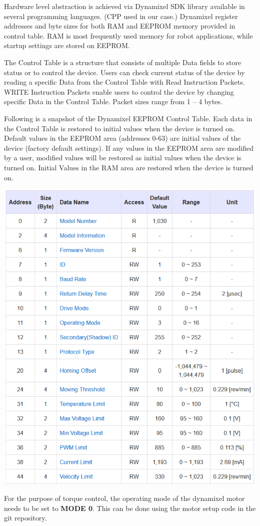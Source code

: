 \documentclass[12]{article}
\begin{document}
Hardware level abstraction is achieved via Dynamixel SDK library available in several programming languages. (CPP used in our case.)
Dynamixel register addresses and byte sizes for both RAM and EEPROM memory provided in control table. RAM is most frequently used memory for robot applications, while startup settings are stored on EEPROM.

The Control Table is a structure that consists of multiple Data fields to store status or to control the device. Users can check current status of the device by reading a specific Data from the Control Table with Read Instruction Packets. WRITE Instruction Packets enable users to control the device by changing specific Data in the Control Table. Packet sizes range from 1 – 4 bytes.

Following is a snapshot of the Dynamixel EEPROM Control Table. Each data in the Control Table is restored to initial values when the device is turned on. Default values in the EEPROM area (addresses 0-63) are initial values of the device (factory default settings). If any values in the EEPROM area are modified by a user, modified values will be restored as initial values when the device is turned on. Initial Values in the RAM area are restored when the device is turned on.

\begin{center}
	\includegraphics[width=0.7\linewidth]{images/dxl_eeprom.png}\\
\end{center}

For the purpose of torque control, the operating mode of the dynamixel motor needs to be set to \textbf{MODE 0}. This can be done using the motor setup code in the git repository.
\end{document}
